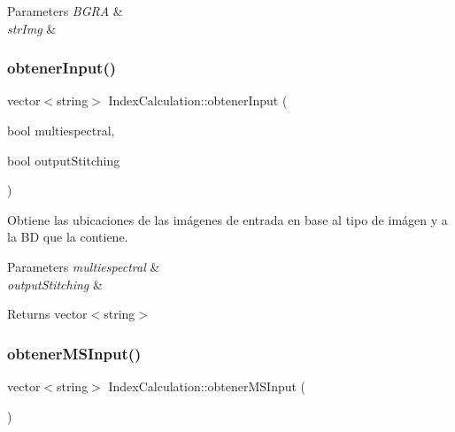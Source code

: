 \begin{DoxyParams}{Parameters}
{\em B\+G\+RA} & \\
\hline
{\em str\+Img} & \\
\hline
\end{DoxyParams}
\mbox{\label{classIndexCalculation_a65a88228b2caf575cbbac793a03d1dd6}} 
\subsubsection{\texorpdfstring{obtener\+Input()}{obtenerInput()}}
{\footnotesize\ttfamily vector$<$string$>$ Index\+Calculation\+::obtener\+Input (\begin{DoxyParamCaption}\item[{bool}]{multiespectral,  }\item[{bool}]{output\+Stitching }\end{DoxyParamCaption})\hspace{0.3cm}{\ttfamily [inline]}}



Obtiene las ubicaciones de las imágenes de entrada en base al tipo de imágen y a la BD que la contiene. 


\begin{DoxyParams}{Parameters}
{\em multiespectral} & \\
\hline
{\em output\+Stitching} & \\
\hline
\end{DoxyParams}
\begin{DoxyReturn}{Returns}
vector$<$string$>$ 
\end{DoxyReturn}
\mbox{\label{classIndexCalculation_a889a95c13bc480c1194016ca0e1e9559}} 
\subsubsection{\texorpdfstring{obtener\+M\+S\+Input()}{obtenerMSInput()}}
{\footnotesize\ttfamily vector$<$string$>$ Index\+Calculation\+::obtener\+M\+S\+Input (\begin{DoxyParamCaption}{ }\end{DoxyParamCaption})\hspace{0.3cm}{\ttfamily [inline]}}



